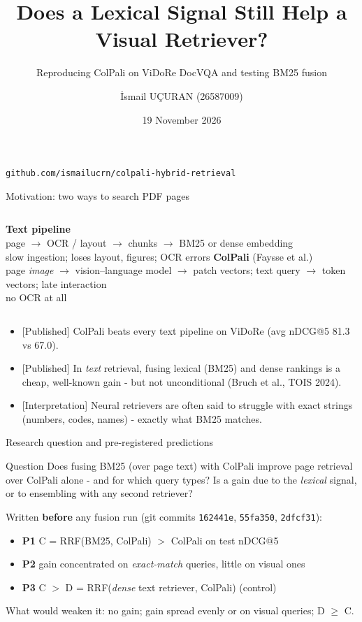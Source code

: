 \documentclass[aspectratio=169,11pt]{beamer}
\title{Does a Lexical Signal Still Help a Visual Retriever?}
\subtitle{Reproducing ColPali on ViDoRe DocVQA and testing BM25 fusion}
\author{\.{I}smail U\c{C}URAN \quad (26587009)}
\institute{YZM5110 Multimodal Learning - Research Project}
\date{19 November 2026}
\newcommand{\lbl}[2]{\textsf{\scriptsize\textcolor{#1}{[#2]}}}
\newcommand{\Pub}{\lbl{cpBlue}{Published}}
\newcommand{\Int}{\lbl{tagI}{Interpretation}}
\begin{document}
\begin{frame}
\titlepage
\centering\footnotesize\texttt{github.com/ismailucrn/colpali-hybrid-retrieval}
\end{frame}

\begin{frame}{Motivation: two ways to search PDF pages}
\begin{columns}[T]
\textbf{Text pipeline}\\[2pt]
page $\rightarrow$ OCR / layout $\rightarrow$ chunks $\rightarrow$ BM25 or dense embedding\\[4pt]
\small\textcolor{muted}{slow ingestion; loses layout, figures; OCR errors}
\textbf{ColPali} (Faysse et al.)\\[2pt]
page \emph{image} $\rightarrow$ vision--language model $\rightarrow$ patch vectors; text query $\rightarrow$ token vectors; late interaction\\[4pt]
\small\textcolor{muted}{no OCR at all}
\end{columns}
\vspace{1em}
\begin{itemize}
  \item \Pub{} ColPali beats every text pipeline on ViDoRe (avg nDCG@5 81.3 vs 67.0).
  \item \Pub{} In \emph{text} retrieval, fusing lexical (BM25) and dense rankings is a cheap, well-known gain - but not unconditional (Bruch et al., TOIS 2024).
  \item \Int{} Neural retrievers are often said to struggle with exact strings (numbers, codes, names) - exactly what BM25 matches.
\end{itemize}
\end{frame}

\begin{frame}{Research question and pre-registered predictions}
\begin{block}{Question}
Does fusing BM25 (over page text) with ColPali improve page retrieval over ColPali alone - and for which query types? Is a gain due to the \emph{lexical} signal, or to ensembling with any second retriever?
\end{block}
\vspace{0.4em}
Written \textbf{before} any fusion run (git commits \texttt{162441e}, \texttt{55fa350}, \texttt{2dfcf31}):
\begin{itemize}
  \item \textbf{P1} \; C = RRF(BM25, ColPali) $>$ ColPali on test nDCG@5
  \item \textbf{P2} \; gain concentrated on \emph{exact-match} queries, little on visual ones
  \item \textbf{P3} \; C $>$ D = RRF(\emph{dense} text retriever, ColPali) \quad (control)
\end{itemize}
\small\textcolor{muted}{What would weaken it: no gain; gain spread evenly or on visual queries; D $\ge$ C.}
\end{frame}
\end{document}
